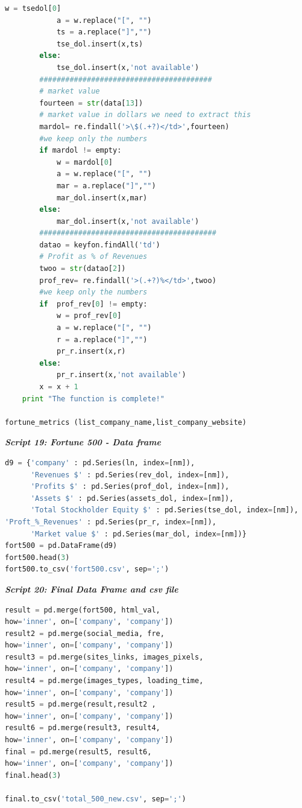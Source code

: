 \documentclass{book}
\begin{document}
\begin{lstlisting}[language=Python]
            w = tsedol[0]
            a = w.replace("[", "")
            ts = a.replace("]","")
            tse_dol.insert(x,ts)
        else:
            tse_dol.insert(x,'not available')
        ########################################
        # market value
        fourteen = str(data[13]) 
        # market value in dollars we need to extract this
        mardol= re.findall('>\$(.+?)</td>',fourteen) 
        #we keep only the numbers
        if mardol != empty:
            w = mardol[0]
            a = w.replace("[", "")
            mar = a.replace("]","")
            mar_dol.insert(x,mar)
        else:
            mar_dol.insert(x,'not available')
        #########################################
        datao = keyfon.findAll('td')        
        # Profit as % of Revenues
        twoo = str(datao[2]) 
        prof_rev= re.findall('>(.+?)%</td>',twoo) 
        #we keep only the numbers
        if  prof_rev[0] != empty:
            w = prof_rev[0]
            a = w.replace("[", "")
            r = a.replace("]","")
            pr_r.insert(x,r)
        else:
            pr_r.insert(x,'not available')
        x = x + 1
    print "The function is complete!"

fortune_metrics (list_company_name,list_company_website)
\end{lstlisting}

\begin{center}
\textit{\textbf{Script 19: Fortune 500 - Data frame}} \label{p22}
\end{center}
\begin{lstlisting}[language=Python]  
d9 = {'company' : pd.Series(ln, index=[nm]),
      'Revenues $' : pd.Series(rev_dol, index=[nm]),
      'Profits $' : pd.Series(prof_dol, index=[nm]),
      'Assets $' : pd.Series(assets_dol, index=[nm]),
      'Total Stockholder Equity $' : pd.Series(tse_dol, index=[nm]),      
'Proft_%_Revenues' : pd.Series(pr_r, index=[nm]),
      'Market value $' : pd.Series(mar_dol, index=[nm])}
fort500 = pd.DataFrame(d9)    
fort500.head(3)
fort500.to_csv('fort500.csv', sep=';')  
\end{lstlisting}

\begin{center}
\textit{\textbf{Script 20: Final Data Frame and csv file}}\label{p23}
\end{center}
\begin{lstlisting}[language=Python]
result = pd.merge(fort500, html_val, 
how='inner', on=['company', 'company'])
result2 = pd.merge(social_media, fre, 
how='inner', on=['company', 'company'])
result3 = pd.merge(sites_links, images_pixels, 
how='inner', on=['company', 'company'])
result4 = pd.merge(images_types, loading_time, 
how='inner', on=['company', 'company'])
result5 = pd.merge(result,result2 , 
how='inner', on=['company', 'company'])
result6 = pd.merge(result3, result4, 
how='inner', on=['company', 'company'])
final = pd.merge(result5, result6, 
how='inner', on=['company', 'company'])
final.head(3)

final.to_csv('total_500_new.csv', sep=';')
\end{lstlisting}
\end{document}
